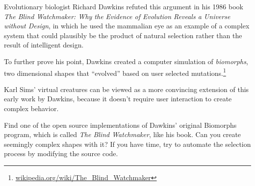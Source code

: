 Evolutionary biologist Richard Dawkins refuted this argument in his 1986 book
{\em The Blind Watchmaker: Why the Evidence of Evolution Reveals a Universe
without Design}, in which he used the mammalian eye as an example of a complex
system that could plausibly be the product of natural selection rather than the
result of intelligent design.

To further prove his point, Dawkins created a computer simulation of {\em
biomorphs}, two dimensional shapes that ``evolved'' based on user selected
mutations.\footnote{\url{wikipedia.org/wiki/The_Blind_Watchmaker}}

Karl Sims' virtual creatures can be viewed as a more convincing extension of this early work by
Dawkins, because it doesn't require user interaction to create complex behavior.

\begin{ex} %
  Find one of the open source implementations of Dawkins' original Biomorphs
  program, which is called {\em The Blind Watchmaker}, like his book. Can you create 
  seemingly complex shapes with it? If you have time, try to automate the selection process
  by modifying the source code. 
\end{ex}
